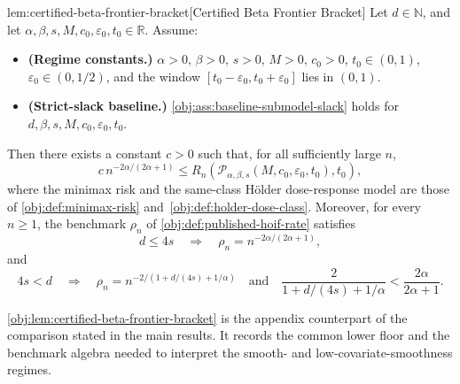 \begin{lemmav}{lem:certified-beta-frontier-bracket}[Certified Beta Frontier Bracket]
Let \(d\in\mathbb N\), and let \(\alpha,\beta,s,M,c_0,\varepsilon_0,t_0\in\mathbb R\). Assume:
\begin{itemize}
\item \textbf{(Regime constants.)} \(\alpha>0\), \(\beta>0\), \(s>0\), \(M>0\), \(c_0>0\), \(t_0\in(0,1)\), \(\varepsilon_0\in(0,1/2)\), and the window \([t_0-\varepsilon_0,t_0+\varepsilon_0]\) lies in \((0,1)\).
\item \textbf{(Strict-slack baseline.)} \cref{obj:ass:baseline-submodel-slack} holds for \(d,\beta,s,M,c_0,\varepsilon_0,t_0\).
\end{itemize}
Then there exists a constant \(c>0\) such that, for all sufficiently large \(n\),
\[
c\,n^{-2\alpha/(2\alpha+1)}
\le
R_n\!\left(\mathcal P_{\alpha,\beta,s}(M,c_0,\varepsilon_0,t_0),t_0\right),
\]
where the minimax risk and the same-class Hölder dose-response model are those of \cref{obj:def:minimax-risk} and~\cref{obj:def:holder-dose-class}. Moreover, for every \(n\ge 1\), the benchmark \(\rho_n\) of \cref{obj:def:published-hoif-rate} satisfies
\[
d\le 4s
\quad\Longrightarrow\quad
\rho_n=n^{-2\alpha/(2\alpha+1)},
\]
and
\[
4s<d
\quad\Longrightarrow\quad
\rho_n=n^{-2/(1+d/(4s)+1/\alpha)}
\quad\text{and}\quad
\frac{2}{1+d/(4s)+1/\alpha}
<
\frac{2\alpha}{2\alpha+1}.
\]
\end{lemmav}

\cref{obj:lem:certified-beta-frontier-bracket} is the appendix counterpart of the comparison stated in the main results. It records the common lower floor and the benchmark algebra needed to interpret the smooth- and low-covariate-smoothness regimes.
